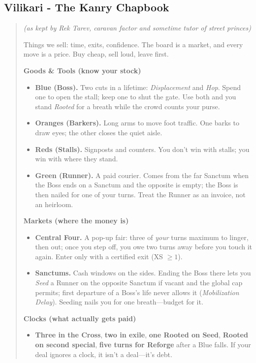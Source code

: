 \documentclass[11pt]{article}
\begin{document}
\subsection{Vilikari - The Kanry Chapbook}
\begin{quote}\small\itshape
(as kept by Rek Tarev, caravan factor and sometime tutor of street princes)

Things we sell: time, exits, confidence. The board is a market, and every move is a price. Buy cheap, sell loud, leave first.

\medskip
\textbf{Goods \& Tools (know your stock)}
\begin{itemize}\itemsep0.2em
  \item \textbf{Blue (Boss).} Two cuts in a lifetime: \emph{Displacement} and \emph{Hop}. Spend one to open the stall; keep one to shut the gate. Use both and you stand \emph{Rooted} for a breath while the crowd counts your purse.
  \item \textbf{Oranges (Barkers).} Long arms to move foot traffic. One barks to draw eyes; the other closes the quiet aisle.
  \item \textbf{Reds (Stalls).} Signposts and counters. You don’t win with stalls; you win with where they stand.
  \item \textbf{Green (Runner).} A paid courier. Comes from the far Sanctum when the Boss ends on a Sanctum and the opposite is empty; the Boss is then nailed for one of your turns. Treat the Runner as an invoice, not an heirloom.
\end{itemize}

\textbf{Markets (where the money is)}
\begin{itemize}\itemsep0.2em
  \item \textbf{Central Four.} A pop-up fair: three of \emph{your} turns maximum to linger, then out; once you step off, you owe two turns away before you touch it again. Enter only with a certified exit (XS $\ge 1$).
  \item \textbf{Sanctums.} Cash windows on the sides. Ending the Boss there lets you \emph{Seed} a Runner on the opposite Sanctum if vacant and the global cap permits; first departure of a Boss’s life never allows it (\emph{Mobilization Delay}). Seeding nails you for one breath—budget for it.
\end{itemize}

\textbf{Clocks (what actually gets paid)}
\begin{itemize}\itemsep0.2em
  \item \textbf{Three in the Cross}, \textbf{two in exile}, \textbf{one Rooted on Seed}, \textbf{Rooted on second special}, \textbf{five turns for Reforge} after a Blue falls. If your deal ignores a clock, it isn’t a deal—it’s debt.
\end{itemize}


\end{quote}
\end{document}
